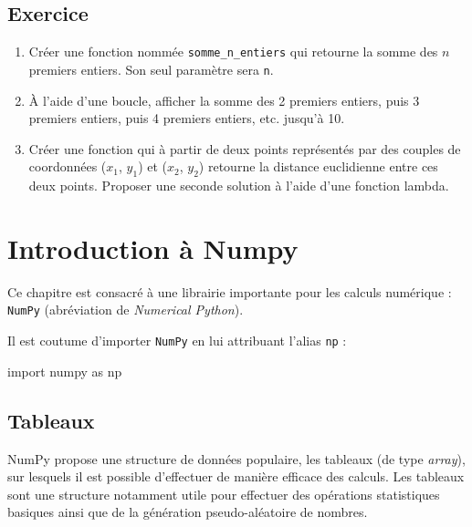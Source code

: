 \documentclass[12pt,]{book}
\newenvironment{Shaded}{\begin{snugshade}}{\end{snugshade}}
\newcommand{\ImportTok}[1]{#1}
\newcommand{\NormalTok}[1]{#1}
\providecommand{\tightlist}{%
  \setlength{\itemsep}{0pt}\setlength{\parskip}{0pt}}
\numberwithin{equation}{section}
\numberwithin{countremarque}{section}
\let\BeginKnitrBlock\begin \let\EndKnitrBlock\end
\begin{document}
\section{Exercice}\label{exercice-6}

\BeginKnitrBlock{exframe}
\begin{enumerate}
\def\labelenumi{\arabic{enumi}.}
\tightlist
\item
  Créer une fonction nommée \texttt{somme\_n\_entiers} qui retourne la
  somme des \(n\) premiers entiers. Son seul paramètre sera \texttt{n}.
\item
  À l'aide d'une boucle, afficher la somme des 2 premiers entiers, puis
  3 premiers entiers, puis 4 premiers entiers, etc. jusqu'à 10.
\item
  Créer une fonction qui à partir de deux points représentés par des
  couples de coordonnées (\(x_1\), \(y_1\)) et (\(x_2\), \(y_2\))
  retourne la distance euclidienne entre ces deux points. Proposer une
  seconde solution à l'aide d'une fonction lambda.
\end{enumerate}
\EndKnitrBlock{exframe}

\chapter{Introduction à Numpy}\label{numpy}

Ce chapitre est consacré à une librairie importante pour les calculs
numérique : \texttt{NumPy} (abréviation de \emph{Numerical Python}).

Il est coutume d'importer \texttt{NumPy} en lui attribuant l'alias
\texttt{np} :

\begin{Shaded}
\begin{Highlighting}[]
\ImportTok{import}\NormalTok{ numpy }\ImportTok{as}\NormalTok{ np}
\end{Highlighting}
\end{Shaded}

\section{Tableaux}\label{tableaux}

NumPy propose une structure de données populaire, les tableaux (de type
\emph{array}), sur lesquels il est possible d'effectuer de manière
efficace des calculs. Les tableaux sont une structure notamment utile
pour effectuer des opérations statistiques basiques ainsi que de la
génération pseudo-aléatoire de nombres.
\end{document}
